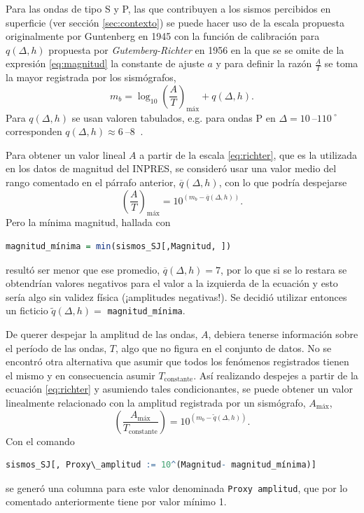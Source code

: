 \documentclass[a4paper]{report}
\begin{document}
Para las ondas de tipo S y P, las que contribuyen a los sismos percibidos en superficie (ver sección \ref{sec:contexto}) se puede hacer uso de la escala propuesta originalmente por Guntenberg en 1945 con la función de calibración para \(q(\Delta, h)\) propuesta por \emph{Gutemberg-Richter} en 1956 \cite[ecuación 4.18]{fowler_solid_1990} en la que se se omite de la expresión \ref{eq:magnitud} la constante de ajuste \(a\) y para definir la razón \(\frac{A}{T}\) se toma la mayor registrada por los sismógrafos,
\begin{equation}
	m_b = \log_{10} \left( \frac{A}{T} \right)_\text{máx} + q(\Delta, h).
	\label{eq:richter}
\end{equation}
Para \(q(\Delta, h)\) se usan valoren tabulados, e.g. para ondas P en \(\Delta = \SIrange{10}{110}{} ^\circ\) corresponden \(q(\Delta, h) \approx \SIrange{6}{8}{}\) \cite{willian_l_ellsworth_earthquake_1991}.

Para obtener un valor lineal \(A\) a partir de la escala \ref{eq:richter}, que es la utilizada en los datos de magnitud del INPRES, se consideró usar una valor medio del rango comentado en el párrafo anterior, \(\overline{q}(\Delta,h)\), con lo que podría despejarse
\begin{equation}
	\left( \frac{A}{T} \right)_\text{máx} = 10^{(m_b - \overline{q}(\Delta,h) )}.
	\label{eq:linealizacionMagnitud}
\end{equation}
Pero la mínima magnitud, hallada con
\begin{lstlisting}[breaklines=true, language=R]
	magnitud_mínima = min(sismos_SJ[,Magnitud, ])
\end{lstlisting}	
resultó ser menor que ese promedio, \(\overline{q}(\Delta,h) = 7\), por lo que si se lo restara se obtendrían valores negativos para el valor a la izquierda de la ecuación y esto sería algo sin validez física (¡amplitudes negativas!).
Se decidió utilizar entonces un ficticio \(\tilde{q}(\Delta,h) = \) \lstinline[language = R]'magnitud_mínima'.  

De querer despejar la amplitud de las ondas, \(A\), debiera tenerse información sobre el período de las ondas, \(T\), algo que no figura en el conjunto de datos.
No se encontró otra alternativa que asumir que todos los fenómenos registrados tienen el mismo y en consecuencia asumir \(T_\text{constante}\).
Así realizando despejes a partir de la ecuación \ref{eq:richter} y asumiendo tales condicionantes, se puede obtener un valor linealmente relacionado con la amplitud registrada por un sismógrafo, \(A_\text{máx}\),
\begin{equation}
	\left( \frac{A_\text{máx}}{T_\text{constante}} \right) = 10^{(m_b - \tilde{q}(\Delta, h))}.
	\label{eq:linealizacionMagnitud_final} 
\end{equation}
Con el comando
\begin{lstlisting}[breaklines=true, language=R]
sismos_SJ[, Proxy\_amplitud := 10^(Magnitud- magnitud_mínima)]
\end{lstlisting}
se generó una columna para este valor denominada \lstinline[language = R]'Proxy amplitud', que por lo comentado anteriormente tiene por valor mínimo \num{1}. 
\end{document}
